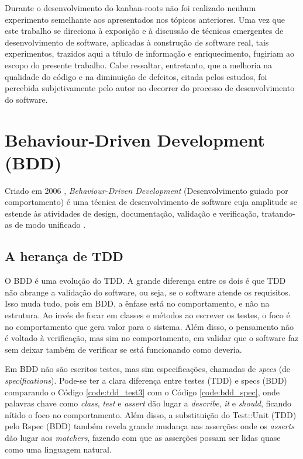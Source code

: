 Durante o desenvolvimento do kanban-roots não foi realizado nenhum experimento semelhante aos apresentados nos tópicos anteriores. Uma vez que este trabalho se direciona à exposição e à discussão de técnicas emergentes de desenvolvimento de software, aplicadas à construção de software real, tais experimentos, trazidos aqui a título de informação e enriquecimento, fugiriam ao escopo do presente trabalho. Cabe ressaltar, entretanto, que a melhoria na qualidade do código e na diminuição de defeitos, citada pelos estudos, foi percebida subjetivamente pelo autor no decorrer do processo de desenvolvimento do software.





\section{Behaviour-Driven Development (BDD)}
\label{sec:bdd}

Criado em 2006 \cite{IntroducingBDD}, \textit{Behaviour-Driven Development} (Desenvolvimento guiado por comportamento) é uma técnica de desenvolvimento de software cuja amplitude se estende às atividades de design, documentação, validação e verificação, tratando-as de modo unificado \cite{BDDRodrigo}.

\subsection{A herança de TDD}
\label{sub:a_heranca_de_tdd}

O BDD é uma evolução do TDD. A grande diferença entre os dois é que TDD não abrange a validação do software, ou seja, se o software atende os requisitos. Isso muda tudo, pois em BDD, a ênfase está no comportamento, e não na estrutura. Ao invés de focar em classes e métodos ao escrever os testes, o foco é no comportamento que gera valor para o sistema. Além disso, o pensamento não é voltado à verificação, mas sim no comportamento, em validar que o software faz sem deixar também de verificar se está funcionando como deveria.

Em BDD não são escritos testes, mas sim especificações, chamadas de \textit{specs} (de \textit{specifications}). Pode-se ter a clara diferença entre testes (TDD) e specs (BDD) comparando o Código \ref{code:tdd_test3} com o Código \ref{code:bdd_spec}, onde palavras chave como \textit{class}, \textit{test} e \textit{assert} dão lugar a \textit{describe}, \textit{it} e \textit{should}, ficando nítido o foco no comportamento. Além disso, a substituição do Test::Unit (TDD) pelo Rspec (BDD) também revela grande mudança nas asserções onde os \textit{asserts} dão lugar aos \textit{matchers}, fazendo com que as asserções possam ser lidas quase como uma linguagem natural.

